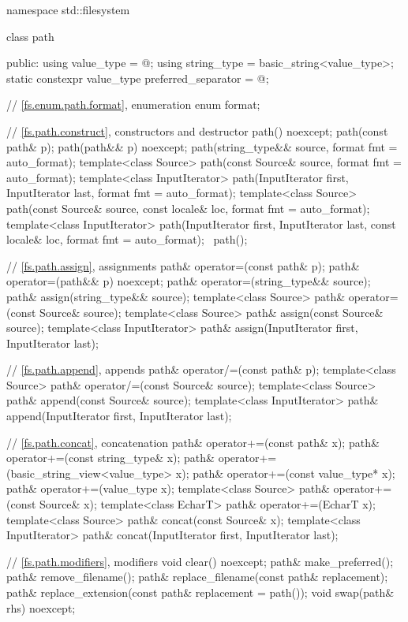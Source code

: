 \begin{codeblock}
namespace std::filesystem {
  class path {
  public:
    using value_type  = @\seebelow@;
    using string_type = basic_string<value_type>;
    static constexpr value_type preferred_separator = @\seebelow@;

    // \ref{fs.enum.path.format}, enumeration 
    enum format;

    // \ref{fs.path.construct}, constructors and destructor
    path() noexcept;
    path(const path& p);
    path(path&& p) noexcept;
    path(string_type&& source, format fmt = auto_format);
    template<class Source>
      path(const Source& source, format fmt = auto_format);
    template<class InputIterator>
      path(InputIterator first, InputIterator last, format fmt = auto_format);
    template<class Source>
      path(const Source& source, const locale& loc, format fmt = auto_format);
    template<class InputIterator>
      path(InputIterator first, InputIterator last, const locale& loc, format fmt = auto_format);
    ~path();

    // \ref{fs.path.assign}, assignments
    path& operator=(const path& p);
    path& operator=(path&& p) noexcept;
    path& operator=(string_type&& source);
    path& assign(string_type&& source);
    template<class Source>
      path& operator=(const Source& source);
    template<class Source>
      path& assign(const Source& source);
    template<class InputIterator>
      path& assign(InputIterator first, InputIterator last);

    // \ref{fs.path.append}, appends
    path& operator/=(const path& p);
    template<class Source>
      path& operator/=(const Source& source);
    template<class Source>
      path& append(const Source& source);
    template<class InputIterator>
      path& append(InputIterator first, InputIterator last);

    // \ref{fs.path.concat}, concatenation
    path& operator+=(const path& x);
    path& operator+=(const string_type& x);
    path& operator+=(basic_string_view<value_type> x);
    path& operator+=(const value_type* x);
    path& operator+=(value_type x);
    template<class Source>
      path& operator+=(const Source& x);
    template<class EcharT>
      path& operator+=(EcharT x);
    template<class Source>
      path& concat(const Source& x);
    template<class InputIterator>
      path& concat(InputIterator first, InputIterator last);

    // \ref{fs.path.modifiers}, modifiers
    void  clear() noexcept;
    path& make_preferred();
    path& remove_filename();
    path& replace_filename(const path& replacement);
    path& replace_extension(const path& replacement = path());
    void  swap(path& rhs) noexcept;

}}
\end{codeblock}
